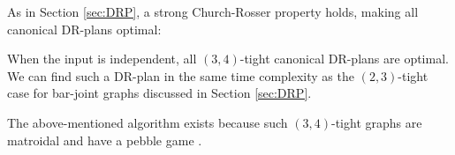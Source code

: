 


As in Section \ref{sec:DRP},  a strong Church-Rosser property holds, making all canonical DR-plans optimal:
%
\begin{observation*}
\label{rem:1dofcanon}
    When the input is independent, all $(3,4)$-tight canonical DR-plans are optimal. We can find such a DR-plan in the same time complexity as the $(2,3)$-tight case for bar-joint graphs discussed in Section \ref{sec:DRP}.
\end{observation*}

The above-mentioned algorithm exists because such $(3,4)$-tight graphs are matroidal and have a pebble game \cite{Lee:2007:PGA}.

\ClearMyMinHeight
{}

